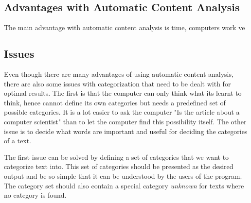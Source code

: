 
\subsection{Advantages with Automatic Content Analysis}
The main advantage with automatic content analysis is time, computers work ve

\subsection{Issues}
Even though there are many advantages of using automatic content analysis, there are also some issues with categorization that need to be dealt with for optimal results. 
The first is that the computer can only think what its learnt to think, hence cannot define its own categories but needs a predefined set of possible categories. It is a lot easier to ask the computer "Is the article about a computer scientist" than to let the computer find this possibility itself. The other issue is to decide what words are important and useful for deciding the categories of a text. 

The first issue can be solved by defining a set of categories that we want to categorize text into. This set of categories should be presented as the desired output and be so simple that it can be understood by the users of the program. The category set should also contain a special category \textit{unknown} for texts where no category is found.

